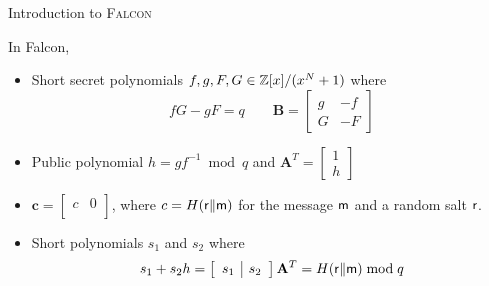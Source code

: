


\begin{frame}{Introduction to \textsc{Falcon}}

In Falcon,
\pause
\begin{itemize}
    \item Short secret polynomials $f, g, F, G \in \mathbb{Z}[x] / (x^N+1)$ where
    \[
    fG - gF = q \qquad \mathbf{B} = \left[
\begin{array}{c|c}
g & -f \\ \hline G & -F
\end{array} \right]
    \]
    \pause
    \item Public polynomial $h = gf^{-1} \bmod q$ and $\mathbf{A}^T = \left[
\begin{array}{c} 1 \\ \hline h \end{array} \right]$ 
	\pause
	\item $\mathbf{c} = \left[ \begin{array}{c|c} c & 0 \\ \end{array} \right ]$, where $c = H({\sf r} \| {\sf m})$ for the message $\sf m$ and a random salt $\sf r$.

    \item Short polynomials $s_1$ and $s_2$ where
    \[
	    s_1 + s_2h = \left[ \begin{array}{c|c} s_1 & s_2 \\ \end{array} \right] \mathbf{A}^T = H({\sf r} \| {\sf m}) \bmod q
    \]
\end{itemize}


\end{frame}


%


